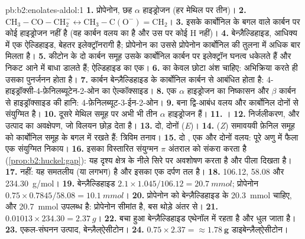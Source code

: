 \begin{solution}{pb:b2:enolates-aldol:1}
\textbf{1.} प्रोपेनोन, छह $\alpha$ हाइड्रोजन (हर मेथिल पर तीन)।
\textbf{2.} $\mathrm{CH_3{-}CO{-}CH_2^-} \leftrightarrow \mathrm{CH_3{-}C(O^-){=}CH_2}$।
\textbf{3.} इसके कार्बोनिल के बगल वाले कार्बन पर कोई हाइड्रोजन नहीं है (वह कार्बन वलय का है और
उस पर कोई H नहीं)।
\textbf{4.} बेन्ज़ैल्डिहाइड, आधिक्य में एक ऐल्डिहाइड, बेहतर इलेक्ट्रॉनरागी है; प्रोपेनोन का  उससे
प्रोपेनोन कार्बोनिल की तुलना में अधिक बार मिलता है।
\textbf{5.} कीटोन के दो कार्बन समूह उसके कार्बोनिल कार्बन पर इलेक्ट्रॉन घनत्व धकेलते हैं और
निकट आने में बाधा डालते हैं; ऐल्डिहाइड का एक।
\textbf{6.}  का केवल छोटा अंश चाहिए: अभिक्रिया करते ही उसका पुनर्जनन होता है।
\textbf{7.}  कार्बन बेन्ज़ैल्डिहाइड के कार्बोनिल कार्बन से आबंधित होता है:
4-हाइड्रॉक्सी-4-फ़ेनिलब्यूटेन-2-ओन का ऐल्कॉक्साइड।
\textbf{8.} एक $\alpha$ हाइड्रोजन का निष्कासन और $\beta$ कार्बन से हाइड्रॉक्साइड की हानि: 4-फ़ेनिलब्यूट-3-ईन-2-ओन।
\textbf{9.} बना द्वि-आबंध वलय और कार्बोनिल दोनों से संयुग्मित है।
\textbf{10.} दूसरे मेथिल समूह पर अभी भी तीन $\alpha$ हाइड्रोजन हैं।
\textbf{11.} ।
\textbf{12.} निर्जलीकरण, और उत्पाद का अवक्षेपण, जो विलयन छोड़ देता है।
\textbf{13.} दो, दोनों (\textit{E})।
\textbf{14.} (\textit{Z}) समावयवी फ़ेनिल समूह को कार्बोनिल समूह के बगल में रखते हैं: त्रिविम तनाव।
\textbf{15.} दो , एक  और दोनों वलय: पूरे अणु में फैला एक संयुग्मित निकाय।
\textbf{16.} इसका विस्तारित संयुग्मन $\pi$ अंतराल को संकरा करता है (\cref{prop:b2:huckel:gap}): यह दृश्य क्षेत्र के
नीले सिरे पर अवशोषण करता है और पीला दिखता है।
\textbf{17.} नहीं: यह समतलीय (या लगभग) है और इसका एक दर्पण तल है।
\textbf{18.} 106.12, 58.08 और \qty{234.30}{g/mol}।
\textbf{19.} बेन्ज़ैल्डिहाइड $2.1 \times 1.045/106.12 = \qty{20.7}{mmol}$; प्रोपेनोन $0.75 \times
0.7845/58.08 = \qty{10.1}{mmol}$।
\textbf{20.} प्रोपेनोन को बेन्ज़ैल्डिहाइड के \qty{20.3}{mmol} चाहिए, और \qty{20.7}{mmol} उपलब्ध है:
प्रोपेनोन सीमांत है, बस थोड़े अंतर से।
\textbf{21.} $0.01013 \times 234.30 = \qty{2.37}{g}$।
\textbf{22.} बचा हुआ बेन्ज़ैल्डिहाइड एथेनॉल में रहता है और धुल जाता है।
\textbf{23.} एकल-संघनन उत्पाद, बेन्ज़ैल्ऐसीटोन।
\textbf{24.} $0.75 \times 2.37 = \boldsymbol{\approx \qty{1.78}{g}}$ डाइबेन्ज़ैल्ऐसीटोन।
\end{solution}
